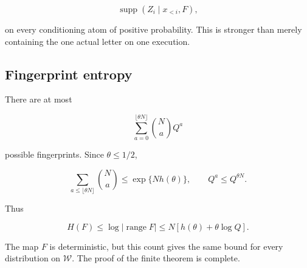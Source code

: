 \[
\operatorname{supp}(Z_i\mid x_{<i},F),
\]

on every conditioning atom of positive probability. This is stronger than merely containing the one actual letter on one execution.

\subsection{Fingerprint entropy}\label{fingerprint-entropy}

There are at most

\[
\sum_{a=0}^{\lfloor\theta N\rfloor}\binom NaQ^a
\]

possible fingerprints. Since \(\theta\le1/2\),

\[
\sum_{a\le\lfloor\theta N\rfloor}\binom Na
\le \exp\{Nh(\theta)\},
\qquad
Q^a\le Q^{\theta N}.
\]

Thus

\[
H(F)\le\log|\operatorname{range}F|
\le N[h(\theta)+\theta\log Q].
\]

The map \(F\) is deterministic, but this count gives the same bound for every distribution on \(\mathcal W\). The proof of the finite theorem is complete.

